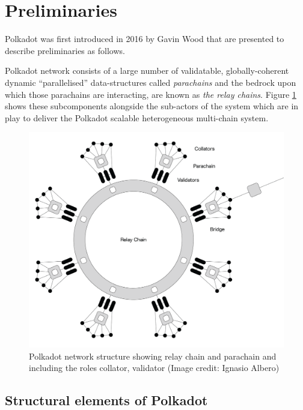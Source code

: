 \section{Preliminaries}\label{sec:preliminiary}

Polkadot was first introduced in 2016 by Gavin Wood \cite{2016:Wood:Polkadot} that are presented to describe preliminaries as follows. 

Polkadot network consists of a large number of validatable, globally-coherent dynamic “parallelised” data-structures called  \emph{parachains} and the bedrock upon which those parachains are interacting, are known as \emph{the relay chains}. Figure \ref{fig:roles} shows these subcomponents alongside the sub-actors of the system which are in play to deliver the Polkadot scalable heterogeneous multi-chain system.

\begin{figure}[h]
	\centering
	\includegraphics[width=.7\textwidth]{images/Network@2x.png}
	\caption{Polkadot network structure showing relay chain and parachain and including the roles collator, validator (Image credit: Ignasio Albero)}
	\label{fig:roles}
\end{figure}
\subsection{Structural elements of Polkadot}

